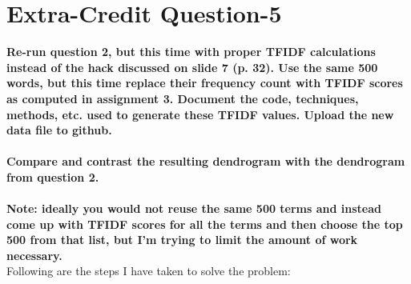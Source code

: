 \chapter{Extra-Credit Question-5}
\label{intro}

\textbf{ Re-run question 2, but this time with proper TFIDF calculations instead of the hack discussed on slide 7 (p. 32).  Use the same 500 words, but this time replace their frequency count with TFIDF scores as computed in assignment 3.  Document the code, techniques, methods, etc. used to generate these TFIDF values.  Upload the new data file to github.\\\\
Compare and contrast the resulting dendrogram with the dendrogram from question 2.\\\\
Note: ideally you would not reuse the same 500 terms and instead come up with TFIDF scores for all the terms and then choose the top 500 from that list, but I'm trying to limit the amount of work necessary.}\\


Following are the steps I have taken to solve the problem:

